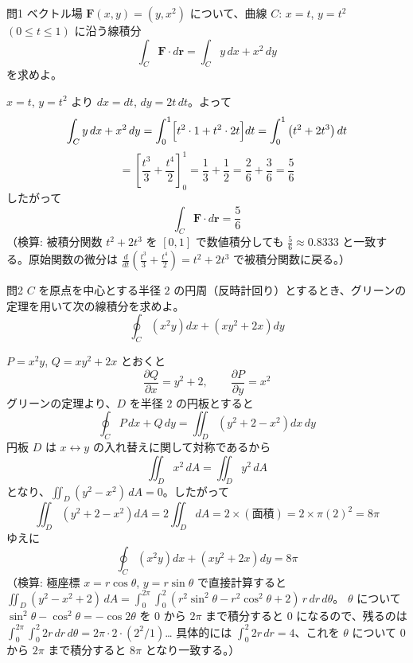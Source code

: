 \documentclass[a4paper,11pt]{article}
\begin{document}
\bigskip

\clearpage
\begin{mondaiboxS}{問1}
ベクトル場 $\bm{F}(x,y) = (y, x^{2})$ について、曲線 $C$: $x = t$, $y = t^{2}$ $(0 \le t \le 1)$ に沿う線積分
\[
\int_{C} \bm{F}\cdot d\bm{r} = \int_{C} y\,dx + x^{2}\,dy
\]
を求めよ。
\end{mondaiboxS}
\kaitou
$x = t$, $y = t^{2}$ より $dx = dt$, $dy = 2t\,dt$。よって
\[
\int_{C} y\,dx + x^{2}\,dy = \int_{0}^{1} \Bigl[ t^{2} \cdot 1 + t^{2} \cdot 2t \Bigr] dt
= \int_{0}^{1} \left( t^{2} + 2t^{3} \right) dt
\]
\[
= \left[ \frac{t^{3}}{3} + \frac{t^{4}}{2} \right]_{0}^{1} = \frac{1}{3} + \frac{1}{2} = \frac{2}{6} + \frac{3}{6} = \frac{5}{6}
\]
したがって
\[
\boxed{\; \int_{C} \bm{F}\cdot d\bm{r} = \frac{5}{6} \;}
\]
（検算: 被積分関数 $t^{2}+2t^{3}$ を $[0,1]$ で数値積分しても $\frac{5}{6}\approx 0.8333$ と一致する。原始関数の微分は $\frac{d}{dt}\left(\frac{t^3}{3}+\frac{t^4}{2}\right)=t^2+2t^3$ で被積分関数に戻る。）

\clearpage
\begin{mondaiboxS}{問2}
$C$ を原点を中心とする半径 $2$ の円周（反時計回り）とするとき、グリーンの定理を用いて次の線積分を求めよ。
\[
\oint_{C} \left(x^{2}y\right) dx + \left(xy^{2} + 2x\right) dy
\]
\end{mondaiboxS}
\kaitou
$P = x^{2}y$, $Q = xy^{2} + 2x$ とおくと
\[
\frac{\partial Q}{\partial x} = y^{2} + 2, \qquad \frac{\partial P}{\partial y} = x^{2}
\]
グリーンの定理より、$D$ を半径 $2$ の円板とすると
\[
\oint_{C} P\,dx + Q\,dy = \iint_{D} \left( y^{2} + 2 - x^{2} \right) dx\,dy
\]
円板 $D$ は $x \leftrightarrow y$ の入れ替えに関して対称であるから
\[
\iint_{D} x^{2}\,dA = \iint_{D} y^{2}\,dA
\]
となり、$\iint_{D} (y^{2} - x^{2})\,dA = 0$。したがって
\[
\iint_{D} \left( y^{2} + 2 - x^{2} \right) dA = 2\iint_{D} dA = 2 \times (\text{面積}) = 2 \times \pi (2)^{2} = 8\pi
\]
ゆえに
\[
\boxed{\; \oint_{C} \left(x^{2}y\right) dx + \left(xy^{2} + 2x\right) dy = 8\pi \;}
\]
（検算: 極座標 $x = r\cos\theta$, $y = r\sin\theta$ で直接計算すると
$\iint_D (y^2 - x^2 + 2)\,dA = \int_0^{2\pi}\!\!\int_0^{2} (r^2\sin^2\theta - r^2\cos^2\theta + 2)\, r\,dr\,d\theta$。
$\theta$ について $\sin^2\theta - \cos^2\theta = -\cos 2\theta$ を $0$ から $2\pi$ まで積分すると $0$ になるので、残るのは
$\int_0^{2\pi}\!\!\int_0^2 2r\,dr\,d\theta = 2\pi \cdot 2\cdot(2^2/1)$… 具体的には $\int_0^2 2r\,dr = 4$、これを $\theta$ について $0$ から $2\pi$ まで積分すると $8\pi$ となり一致する。）
\end{document}
